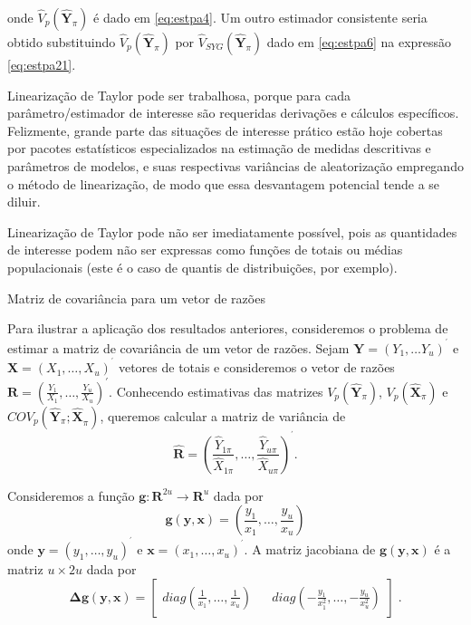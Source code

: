 \documentclass[]{book}
\theoremstyle{definition}
\theoremstyle{definition}
\theoremstyle{definition}
\theoremstyle{remark}
\let\BeginKnitrBlock\begin \let\EndKnitrBlock\end
\begin{document}
onde \(\hat{V}_{p}\left( \mathbf{\hat{Y}}_{\pi }\right)\) é dado em
\eqref{eq:estpa4}. Um outro estimador consistente seria obtido
substituindo \(\hat{V}_{p}\left( \mathbf{\hat{Y}}_{\pi }\right)\) por
\(\hat{V}_{SYG}\left( \mathbf{\hat{Y}}_{\pi }\right)\) dado em
\eqref{eq:estpa6} na expressão \eqref{eq:estpa21}.

Linearização de Taylor pode ser trabalhosa, porque para cada
parâmetro/estimador de interesse são requeridas derivações e cálculos
específicos. Felizmente, grande parte das situações de interesse prático
estão hoje cobertas por pacotes estatísticos especializados na estimação
de medidas descritivas e parâmetros de modelos, e suas respectivas
variâncias de aleatorização empregando o método de linearização, de modo
que essa desvantagem potencial tende a se diluir.

Linearização de Taylor pode não ser imediatamente possível, pois as
quantidades de interesse podem não ser expressas como funções de totais
ou médias populacionais (este é o caso de quantis de distribuições, por
exemplo).\medskip 

\BeginKnitrBlock{example}
\protect\hypertarget{exm:exe32}{}{\label{exm:exe32} }Matriz de covariância
para um vetor de razões
\EndKnitrBlock{example}

Para ilustrar a aplicação dos resultados anteriores, consideremos o
problema de estimar a matriz de covariância de um vetor de razões. Sejam
\(\mathbf{Y}=\left( Y_{1},\ldots Y_{u}\right) ^{^{\prime }}\) e
\(\mathbf{X}=\left( X_{1},\ldots ,X_{u}\right) ^{^{\prime }}\) vetores
de totais e consideremos o vetor de razões
\(\mathbf{R=}\left( \frac{Y_{1}}{X_{1}},\ldots ,\frac{Y_{u}}{X_{u}}\right) ^{\prime }.\)
Conhecendo estimativas das matrizes
\(V_{p}\left( \mathbf{\hat{Y}}_{\pi }\right)\),
\(V_{p}\left( \mathbf{\hat{X}}_{\pi }\right)\) e
\(COV_{p}\left( \mathbf{\hat{Y}}_{\pi }\mathbf{;\hat{X}}_{\pi }\right)\),
queremos calcular a matriz de variância de \[
\widehat{\mathbf{R}}\mathbf{=}\left( \frac{\hat{Y}_{1\pi }}{\hat{X}_{1\pi }},\ldots ,\frac{\hat{Y}_{u\pi }}{\hat{X}_{u\pi }}\right) ^{^{\prime }}. 
\]

Consideremos a função
\(\mathbf{g}:\textbf{R}^{2u}\rightarrow \textbf{R}^{u}\) dada por \[
\mathbf{g}\left( \mathbf{y},\mathbf{x}\right) =\left( \frac{y_{1}}{x_{1}},\ldots ,\frac{y_{u}}{x_{u}}\right) 
\] onde \(\mathbf{y=}\left( y_{1},\ldots ,y_{u}\right) ^{^{\prime }}\) e
\(\mathbf{x=}\left( x_{1},\ldots,x_{u}\right) ^{^{\prime }}\). A matriz
jacobiana de \(\mathbf{g}\left( \mathbf{y},\mathbf{x}\right)\) é a
matriz \(u\times 2u\) dada por \[
\mathbf{\Delta g}\left( \mathbf{y},\mathbf{x}\right) =\left[ 
\begin{array}{lll}
diag\left( \frac{1}{x_{1}},\ldots ,\frac{1}{x_{u}}\right) &  & diag\left( -\frac{y_{1}}{x_{1}^{2}},\ldots ,-\frac{y_{u}}{x_{u}^{2}}\right)
\end{array}
\right] \;\mbox{.} 
\]
\end{document}
